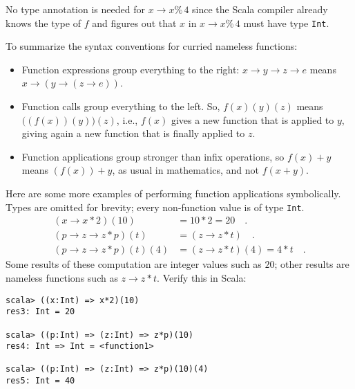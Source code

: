 \noindent No type annotation is needed for $x\rightarrow x\%\,4$
since the Scala compiler already knows the type of $f$ and figures
out that $x$ in $x\rightarrow x\%\,4$ must have type \lstinline!Int!.

To summarize the syntax conventions for curried nameless functions:
\begin{itemize}
\item Function expressions group everything to the right: $x\rightarrow y\rightarrow z\rightarrow e$
means $x\rightarrow\left(y\rightarrow\left(z\rightarrow e\right)\right)$.
\item Function calls group everything to the left. So, $f(x)(y)(z)$ means
$\big((f(x))(y)\big)(z)$, i.e., $f(x)$ gives a new function that
is applied to $y$, giving again a new function that is finally applied
to $z$.
\item Function applications group stronger than infix operations, so $f(x)+y$
means $(f(x))+y$, as usual in mathematics, and not $f(x+y)$.
\end{itemize}
Here are some more examples of performing function applications symbolically.
Types are omitted for brevity; every non-function value is of type
\texttt{}\lstinline!Int!.
\begin{align*}
\left(x\rightarrow x*2\right)(10) & =10*2=20\quad.\\
\left(p\rightarrow z\rightarrow z*p\right)\left(t\right) & =(z\rightarrow z*t)\quad.\\
\left(p\rightarrow z\rightarrow z*p\right)(t)(4) & =(z\rightarrow z*t)(4)=4*t\quad.
\end{align*}
Some results of these computation are integer values such as $20$;
other results are nameless functions such as $z\rightarrow z*t$.
Verify this in Scala:
\begin{lstlisting}
scala> ((x:Int) => x*2)(10)
res3: Int = 20

scala> ((p:Int) => (z:Int) => z*p)(10)
res4: Int => Int = <function1>

scala> ((p:Int) => (z:Int) => z*p)(10)(4)
res5: Int = 40 
\end{lstlisting}

